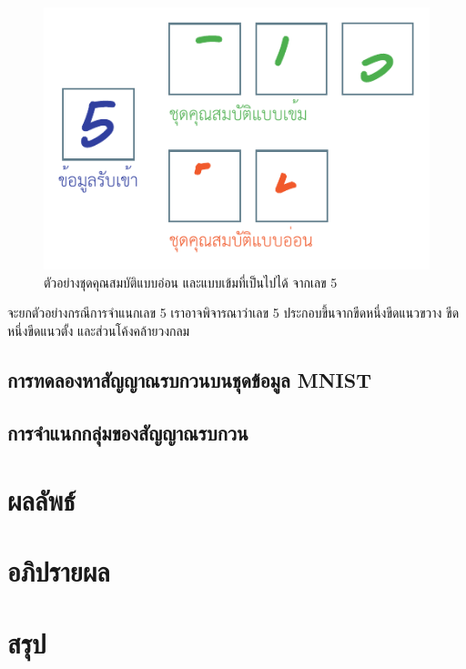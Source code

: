 \documentclass{cpepaper}
\begin{document}
\begin{figure}
    \centering
    \includegraphics[width=\columnwidth]{images/strong-weak-features.pdf}
    \caption{ตัวอย่างชุดคุณสมบัติแบบอ่อน และแบบเข้มที่เป็นไปได้ จากเลข 5}
\end{figure}

จะยกตัวอย่างกรณีการจำแนกเลข 5 เราอาจพิจารณาว่าเลข 5 ประกอบขึ้นจากขีดหนึ่งขีดแนวขวาง ขีดหนึ่งขีดแนวตั้ง และส่วนโค้งคล้ายวงกลม 

\subsection{การทดลองหาสัญญาณรบกวนบนชุดข้อมูล MNIST}

\subsection{การจำแนกกลุ่มของสัญญาณรบกวน}

\section{ผลลัพธ์}

\section{อภิปรายผล}

\section{สรุป}
\end{document}
